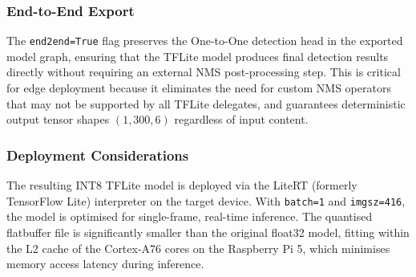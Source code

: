 \subsubsection{End-to-End Export}
The \texttt{end2end=True} flag preserves the One-to-One detection head in the exported model graph, ensuring that the TFLite model produces final detection results directly without requiring an external NMS post-processing step. This is critical for edge deployment because it eliminates the need for custom NMS operators that may not be supported by all TFLite delegates, and guarantees deterministic output tensor shapes $(1, 300, 6)$ regardless of input content.

\subsubsection{Deployment Considerations}
The resulting INT8 TFLite model is deployed via the LiteRT (formerly TensorFlow Lite) interpreter on the target device. With \texttt{batch=1} and \texttt{imgsz=416}, the model is optimised for single-frame, real-time inference. The quantised flatbuffer file is significantly smaller than the original float32 model, fitting within the L2 cache of the Cortex-A76 cores on the Raspberry Pi 5, which minimises memory access latency during inference.








